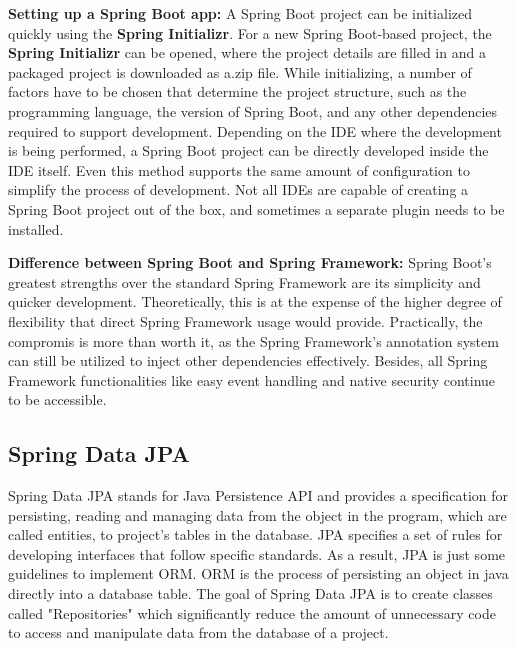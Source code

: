     \textbf{Setting up a Spring Boot app:} \newline
    A Spring Boot project can be initialized quickly using the \textbf{Spring Initializr}. For a new Spring Boot-based project, the \textbf{Spring Initializr} can be opened, where the project details are filled in and a packaged project is downloaded as a.zip file. While initializing, a number of factors have to be chosen that determine the project structure, such as the programming language, the version of Spring Boot, and any other dependencies required to support development. \newline
    Depending on the IDE where the development is being performed, a Spring Boot project can be directly developed inside the IDE itself. Even this method supports the same amount of configuration to simplify the process of development. Not all IDEs are capable of creating a Spring Boot project out of the box, and sometimes a separate plugin needs to be installed.\Autocite{Andi:SpringInit}
    
    \textbf{Difference between Spring Boot and Spring Framework:} \newline
    Spring Boot's greatest strengths over the standard Spring Framework are its simplicity and quicker development. Theoretically, this is at the expense of the higher degree of flexibility that direct Spring Framework usage would provide. Practically, the compromis is more than  worth it, as the Spring Framework's annotation system can still be utilized to inject other dependencies effectively. Besides, all Spring Framework functionalities like easy event handling and native security continue to be accessible. \Autocite{Andi:SpringBoot2}
    
    \subsection{Spring Data JPA}
    Spring Data JPA stands for Java Persistence API and provides a specification for persisting, reading and managing data from the object in the program, which are called entities, to project's tables in the database. JPA specifies a set of rules for developing interfaces that follow specific standards. As a result, JPA is just some guidelines to implement ORM.
    ORM is the process of persisting an object in java directly into a database table. \newline
    The goal of Spring Data JPA is to create classes called "Repositories" which significantly reduce the amount of unnecessary code to access and manipulate data from the database of a project. \newline 

